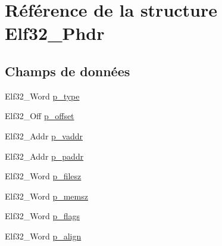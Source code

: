 \hypertarget{structElf32__Phdr}{\section{Référence de la structure Elf32\-\_\-\-Phdr}
\label{structElf32__Phdr}
}
\subsection*{Champs de données}
\begin{DoxyCompactItemize}
\item 
Elf32\-\_\-\-Word \hyperlink{structElf32__Phdr_a8b1d2942ddb9abcb85db1429b5116923}{p\-\_\-type}
\item 
Elf32\-\_\-\-Off \hyperlink{structElf32__Phdr_ac590d4c4b26104216e53058b5b03eef0}{p\-\_\-offset}
\item 
Elf32\-\_\-\-Addr \hyperlink{structElf32__Phdr_a01a298ebc899bcf9c23211a7bf1155a6}{p\-\_\-vaddr}
\item 
Elf32\-\_\-\-Addr \hyperlink{structElf32__Phdr_af18f0a179a5fca09e3c04bcdce3fac2f}{p\-\_\-paddr}
\item 
Elf32\-\_\-\-Word \hyperlink{structElf32__Phdr_ac9151f2e11001284bf1c7d2d2659555c}{p\-\_\-filesz}
\item 
Elf32\-\_\-\-Word \hyperlink{structElf32__Phdr_ada1cdd3d6ccb79a17bed0e3c21379c84}{p\-\_\-memsz}
\item 
Elf32\-\_\-\-Word \hyperlink{structElf32__Phdr_a35c457e6828894b7b275730593802050}{p\-\_\-flags}
\item 
Elf32\-\_\-\-Word \hyperlink{structElf32__Phdr_afd09d9e4297b13fc94fd57d09f2a9f70}{p\-\_\-align}
\end{DoxyCompactItemize}



